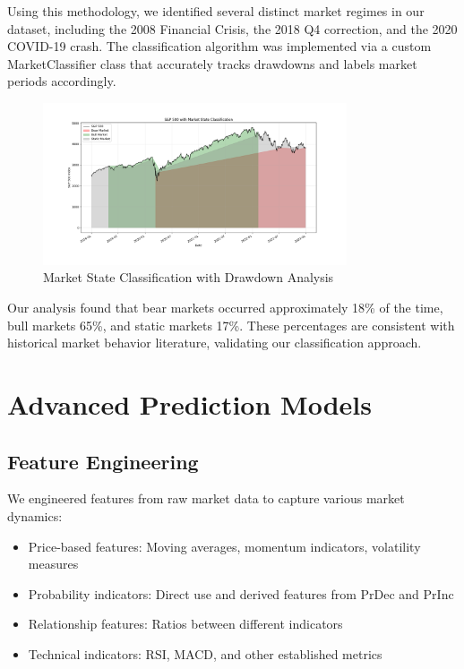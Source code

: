 \documentclass[10pt]{article}
\begin{document}
Using this methodology, we identified several distinct market regimes in our dataset, including the 2008 Financial Crisis, the 2018 Q4 correction, and the 2020 COVID-19 crash. The classification algorithm was implemented via a custom MarketClassifier class that accurately tracks drawdowns and labels market periods accordingly.

\begin{figure}[htbp]
    \centering
    \includegraphics[width=0.8\textwidth]{../results/market_states.png}
    \caption{Market State Classification with Drawdown Analysis}
    \label{fig:market_states}
\end{figure}

Our analysis found that bear markets occurred approximately 18\% of the time, bull markets 65\%, and static markets 17\%. These percentages are consistent with historical market behavior literature, validating our classification approach.

\section{Advanced Prediction Models}
\subsection{Feature Engineering}
We engineered features from raw market data to capture various market dynamics:
\begin{itemize}
    \item Price-based features: Moving averages, momentum indicators, volatility measures
    \item Probability indicators: Direct use and derived features from PrDec and PrInc
    \item Relationship features: Ratios between different indicators
    \item Technical indicators: RSI, MACD, and other established metrics
\end{itemize}
\end{document}
